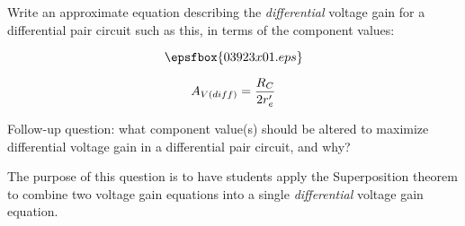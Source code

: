 

Write an approximate equation describing the {\it differential} voltage gain for a differential pair circuit such as this, in terms of the component values:

$$\epsfbox{03923x01.eps}$$







$$A_{V(diff)} = {R_C \over 2r'_e}$$

\vskip 10pt

Follow-up question: what component value(s) should be altered to maximize differential voltage gain in a differential pair circuit, and why?







The purpose of this question is to have students apply the Superposition theorem to combine two voltage gain equations into a single {\it differential} voltage gain equation.




